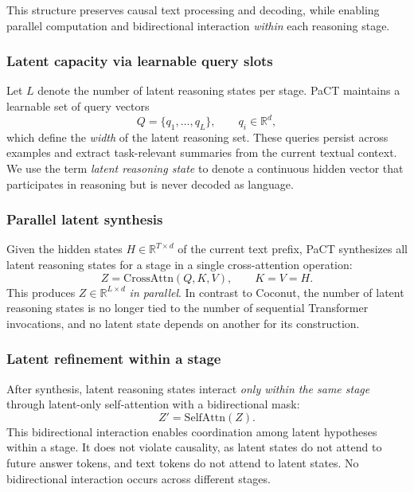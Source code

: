This structure preserves causal text processing and decoding, while enabling parallel computation and
bidirectional interaction \emph{within} each reasoning stage.

\subsubsection{Latent capacity via learnable query slots}
\label{sec:codebook}

Let $L$ denote the number of latent reasoning states per stage. PaCT maintains a learnable set of query
vectors
\[
Q = \{q_1,\dots,q_L\}, \qquad q_i \in \mathbb{R}^d,
\]
which define the \emph{width} of the latent reasoning set. These queries persist across examples and
extract task-relevant summaries from the current textual context. We use the term \emph{latent reasoning
state} to denote a continuous hidden vector that participates in reasoning but is never decoded as
language.

\subsubsection{Parallel latent synthesis}
\label{sec:latent_synthesis}

Given the hidden states $H \in \mathbb{R}^{T \times d}$ of the current text prefix, PaCT synthesizes all
latent reasoning states for a stage in a single cross-attention operation:
\[
Z = \mathrm{CrossAttn}(Q, K, V), \qquad K = V = H.
\]
This produces $Z \in \mathbb{R}^{L \times d}$ \emph{in parallel}. In contrast to Coconut, the number of
latent reasoning states is no longer tied to the number of sequential Transformer invocations, and no
latent state depends on another for its construction.

\subsubsection{Latent refinement within a stage}
\label{sec:latent_refinement}

After synthesis, latent reasoning states interact \emph{only within the same stage} through latent-only
self-attention with a bidirectional mask:
\[
Z' = \mathrm{SelfAttn}(Z).
\]
This bidirectional interaction enables coordination among latent hypotheses within a stage. It does
not violate causality, as latent states do not attend to future answer tokens, and text tokens do not
attend to latent states. No bidirectional interaction occurs across different stages.

